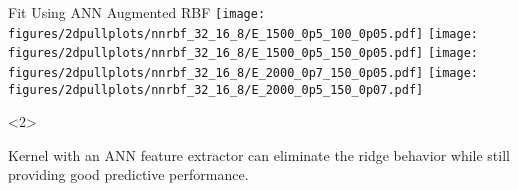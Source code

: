 \documentclass[10pt]{beamer}
\begin{document}
\begin{frame}{Fit Using ANN Augmented RBF}
  \makegrid%
  {}%
  {\texttt{[image: figures/2dpullplots/nnrbf\_32\_16\_8/E\_1500\_0p5\_100\_0p05.pdf]}}%
  {\texttt{[image: figures/2dpullplots/nnrbf\_32\_16\_8/E\_1500\_0p5\_150\_0p05.pdf]}}%
  { }%
  {\texttt{[image: figures/2dpullplots/nnrbf\_32\_16\_8/E\_2000\_0p7\_150\_0p05.pdf]}}%
  {\texttt{[image: figures/2dpullplots/nnrbf\_32\_16\_8/E\_2000\_0p5\_150\_0p07.pdf]}}%

  \begin{onlyenv}<2>
    \begin{beamerpopover}
      \begin{block}{}
        Kernel with an ANN feature extractor can eliminate the ridge behavior while still providing good predictive performance. 
      \end{block}
    \end{beamerpopover}
  \end{onlyenv}
\end{frame}
\end{document}
